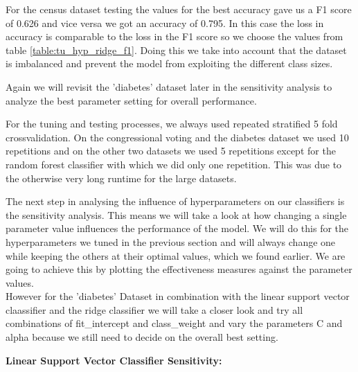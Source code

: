 \documentclass[a4paper,12pt]{article}
\begin{document}
For the census dataset testing the values for the best accuracy gave us a F1 score of 0.626 and vice versa we got an accuracy of 0.795. In this case the loss in accuracy is comparable to the loss in the F1 score so we choose the values from table \ref{table:tu_hyp_ridge_f1}. Doing this we take into account that the dataset is imbalanced and prevent the model from exploiting the different class sizes.

Again we will revisit the 'diabetes' dataset later in the sensitivity analysis to analyze the best parameter setting for overall performance.


For the tuning and testing processes, we always used repeated stratified 5 fold crossvalidation. On the congressional voting and the diabetes dataset we used 10 repetitions and on the other two datasets we used 5 repetitions except for the random forest classifier with which we did only one repetition. This was due to the otherwise very long runtime for the large datasets.

The next step in analysing the influence of hyperparameters on our classifiers is the sensitivity analysis. This means we will take a look at how changing a single parameter value influences the performance of the model. We will do this for the hyperparameters we tuned in the previous section and will always change one while keeping the others at their optimal values, which we found earlier. We are going to achieve this by plotting the effectiveness measures against the parameter values.\\
However for the 'diabetes' Dataset in combination with the linear support vector claassifier and the ridge classifier we will take a closer look and try all combinations of \textsf{fit\_intercept} and \textsf{class\_weight} and vary the parameters \textsf{C} and \textsf{alpha} because we still need to decide on the overall best setting.

\textbf{Linear Support Vector Classifier Sensitivity:}
\end{document}
